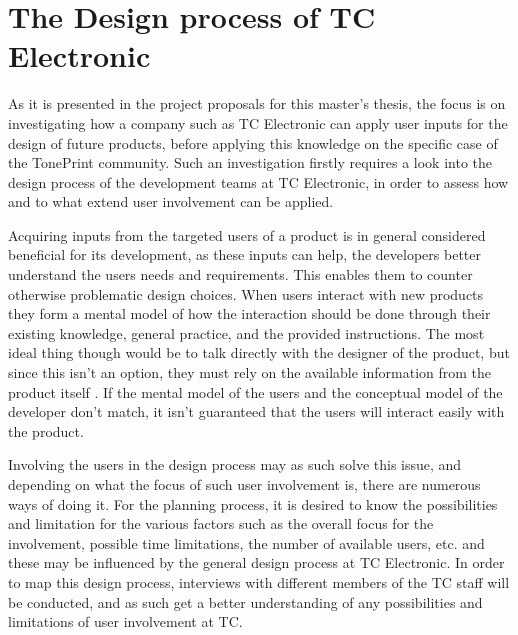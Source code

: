 \chapter{The Design process of TC Electronic}
\label{Interview}
As it is presented in the project proposals for this master's thesis, the focus is on investigating how a company such as TC Electronic can apply user inputs for the design of future products, before applying this knowledge on the specific case of the TonePrint community. Such an investigation firstly requires a look into the design process of the development teams at TC Electronic, in order to assess how and to what extend user involvement can be applied.

Acquiring inputs from the targeted users of a product is in general considered beneficial for its development, as these inputs can help, the developers better understand the users needs and requirements. This enables them to counter otherwise problematic design choices. When users interact with new products they form a mental model of how the interaction should be done through their existing knowledge, general practice, and the provided instructions. The most ideal thing though would be to talk directly with the designer of the product, but since this isn't an option, they must rely on the available information from the product itself \parencite[][31]{PDF:DonNorman}. If the mental model of the users and the conceptual model of the developer don't match, it isn't guaranteed that the users will interact easily with the product.  

Involving the users in the design process may as such solve this issue, and depending on what the focus of such user involvement is, there are numerous ways of doing it. For the planning process, it is desired to know the possibilities and limitation for the various factors such as the overall focus for the involvement, possible time limitations, the number of available users, etc. and these may be influenced by the general design process at TC Electronic. In order to map this design process, interviews with different members of the TC staff will be conducted, and as such get a better understanding of any possibilities and limitations of user involvement at TC.


